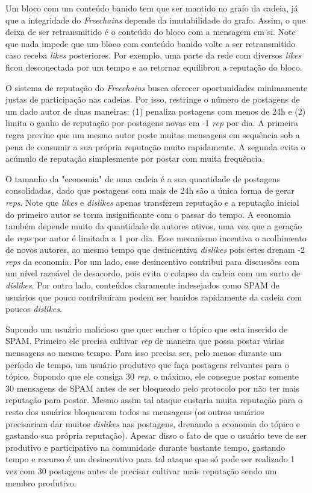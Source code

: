 \documentclass[12pt]{article}
\newcommand{\FC} {\textit{Freechains}\xspace}
\begin{document}
Um bloco com um conteúdo banido tem que ser mantido no grafo da cadeia, já que a integridade do \FC depende da imutabilidade do grafo.
Assim, o que deixa de ser retransmitido é o conteúdo do bloco com a mensagem em si.
Note que nada impede que um bloco com conteúdo banido volte a ser retransmitido caso receba \textit{likes} posteriores.
Por exemplo, uma parte da rede com diversos \textit{likes} ficou desconectada por um tempo e ao retornar equilibrou a reputação do bloco.

O sistema de reputação do \FC busca oferecer oportunidades minimamente justas de participação nas cadeias.
Por isso, restringe o número de postagens de um dado autor de duas maneiras:
    (1) penaliza postagens com menos de 24h e
    (2) limita o ganho de reputação por postagens novas em -1 \textit{rep} por dia.
A primeira regra previne que um mesmo autor poste muitas mensagens em sequência sob a pena de consumir a sua própria reputação muito rapidamente.
A segunda evita o acúmulo de reputação simplesmente por postar com muita frequência.

O tamanho da "economia" de uma cadeia é a sua quantidade de postagens consolidadas, dado que postagens com mais de 24h são a única forma de gerar \textit{reps}.
Note que \textit{likes} e \textit{dislikes} apenas transferem reputação e a reputação inicial do primeiro autor se torna insignificante com o passar do tempo.
A economia também depende muito da quantidade de autores ativos, uma vez que a geração de \textit{reps} por autor é limitada a 1 por dia.
Esse mecanismo incentiva o acolhimento de novos autores, ao mesmo tempo que desincentiva \textit{dislikes} pois estes drenam -2 \textit{reps} da economia.
Por um lado, esse desincentivo contribui para discussões com um nível razoável de desacordo, pois evita o colapso da cadeia com um surto de \textit{dislikes}.
Por outro lado, conteúdos claramente indesejados como SPAM de usuários que pouco contribuíram podem ser banidos rapidamente da cadeia com poucos \textit{dislikes}.

Supondo um usuário malicioso que quer encher o tópico que esta inserido de SPAM. 
Primeiro ele precisa cultivar \textit{rep} de maneira que possa postar várias mensagens ao mesmo tempo.
Para isso precisa ser, pelo menos durante um período de tempo, um usuário produtivo que faça postagens relvantes para o tópico.
Supondo que ele consiga 30 \textit{rep}, o máximo, ele consegue postar somente 30 mensagens de SPAM antes de ser bloqueado pelo protocolo por não ter mais reputação para postar.
Mesmo assim tal ataque custaria muita reputação para o resto dos usuários bloquearem todos as mensagens (os outros usuários precisariam dar muitos \textit{dislikes} nas postagens, drenando a economia do tópico e gastando sua própria reputação).
Apesar disso o fato de que o usuário teve de ser produtivo e participativo na comunidade durante bastante tempo, gastando tempo e recurso é um desincentivo para tal ataque que só pode ser realizado 1 vez com 30 postagens antes de precisar cultivar mais reputação sendo um membro produtivo.
\end{document}
